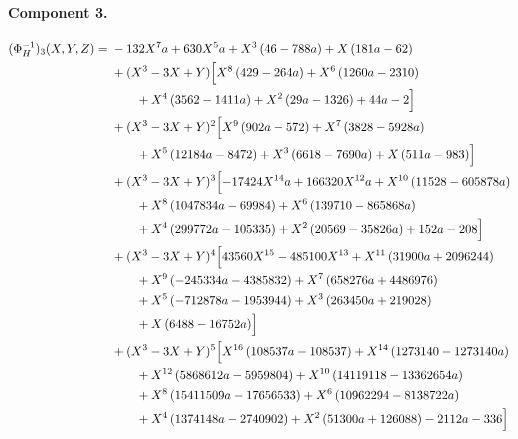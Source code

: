 \endgroup

\clearpage

\paragraph{Component 3.}

\begingroup\footnotesize\allowdisplaybreaks[4]

\begin{align*}
(\Phi_H^{-1})_3(X,Y,Z)={}&- 132 X^{7} a + 630 X^{5} a + X^{3} \left(46 - 788 a\right) + X \left(181 a - 62\right)\\
&{}+(X^3-3X+Y)\Bigl[X^{8} \left(429 - 264 a\right) + X^{6} \left(1260 a - 2310\right)\\
&\qquad + X^{4} \left(3562 - 1411 a\right) + X^{2} \left(29 a - 1326\right) + 44 a - 2\Bigr]\\
&{}+(X^3-3X+Y)^{2}\Bigl[X^{9} \left(902 a - 572\right) + X^{7} \left(3828 - 5928 a\right)\\
&\qquad + X^{5} \left(12184 a - 8472\right) + X^{3} \left(6618 - 7690 a\right) + X \left(511 a - 983\right)\Bigr]\\
&{}+(X^3-3X+Y)^{3}\Bigl[- 17424 X^{14} a + 166320 X^{12} a + X^{10} \left(11528 - 605878 a\right)\\
&\qquad + X^{8} \left(1047834 a - 69984\right) + X^{6} \left(139710 - 865868 a\right)\\
&\qquad + X^{4} \left(299772 a - 105335\right) + X^{2} \left(20569 - 35826 a\right) + 152 a - 208\Bigr]\\
&{}+(X^3-3X+Y)^{4}\Bigl[43560 X^{15} - 485100 X^{13} + X^{11} \left(31900 a + 2096244\right)\\
&\qquad + X^{9} \left(- 245334 a - 4385832\right) + X^{7} \left(658276 a + 4486976\right)\\
&\qquad + X^{5} \left(- 712878 a - 1953944\right) + X^{3} \left(263450 a + 219028\right)\\
&\qquad + X \left(6488 - 16752 a\right)\Bigr]\\
&{}+(X^3-3X+Y)^{5}\Bigl[X^{16} \left(108537 a - 108537\right) + X^{14} \left(1273140 - 1273140 a\right)\\
&\qquad + X^{12} \left(5868612 a - 5959804\right) + X^{10} \left(14119118 - 13362654 a\right)\\
&\qquad + X^{8} \left(15411509 a - 17656533\right) + X^{6} \left(10962294 - 8138722 a\right)\\
&\qquad + X^{4} \left(1374148 a - 2740902\right) + X^{2} \left(51300 a + 126088\right) - 2112 a - 336\Bigr]\\

\end{align*}
